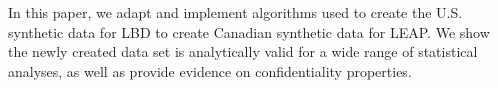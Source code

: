 
In this paper, we adapt and implement algorithms used to create the U.S. synthetic data for LBD to create Canadian synthetic data for LEAP. We show the newly created data set is analytically valid for a wide range of statistical analyses,  as well as provide evidence on confidentiality properties.
